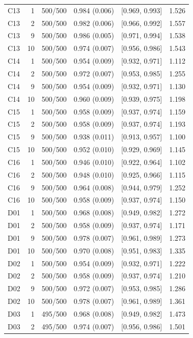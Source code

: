 \begin{longtable}[t]{lrllll}
C13 & 1 & 500/500 & 0.984 (0.006) & {}[0.969, 0.993] & 1.526\\
C13 & 2 & 500/500 & 0.982 (0.006) & {}[0.966, 0.992] & 1.557\\
C13 & 9 & 500/500 & 0.986 (0.005) & {}[0.971, 0.994] & 1.538\\
C13 & 10 & 500/500 & 0.974 (0.007) & {}[0.956, 0.986] & 1.543\\
C14 & 1 & 500/500 & 0.954 (0.009) & {}[0.932, 0.971] & 1.112\\
C14 & 2 & 500/500 & 0.972 (0.007) & {}[0.953, 0.985] & 1.255\\
C14 & 9 & 500/500 & 0.954 (0.009) & {}[0.932, 0.971] & 1.130\\
C14 & 10 & 500/500 & 0.960 (0.009) & {}[0.939, 0.975] & 1.198\\
C15 & 1 & 500/500 & 0.958 (0.009) & {}[0.937, 0.974] & 1.159\\
C15 & 2 & 500/500 & 0.958 (0.009) & {}[0.937, 0.974] & 1.193\\
C15 & 9 & 500/500 & 0.938 (0.011) & {}[0.913, 0.957] & 1.100\\
C15 & 10 & 500/500 & 0.952 (0.010) & {}[0.929, 0.969] & 1.145\\
C16 & 1 & 500/500 & 0.946 (0.010) & {}[0.922, 0.964] & 1.102\\
C16 & 2 & 500/500 & 0.948 (0.010) & {}[0.925, 0.966] & 1.115\\
C16 & 9 & 500/500 & 0.964 (0.008) & {}[0.944, 0.979] & 1.252\\
C16 & 10 & 500/500 & 0.958 (0.009) & {}[0.937, 0.974] & 1.150\\
D01 & 1 & 500/500 & 0.968 (0.008) & {}[0.949, 0.982] & 1.272\\
D01 & 2 & 500/500 & 0.958 (0.009) & {}[0.937, 0.974] & 1.171\\
D01 & 9 & 500/500 & 0.978 (0.007) & {}[0.961, 0.989] & 1.273\\
D01 & 10 & 500/500 & 0.970 (0.008) & {}[0.951, 0.983] & 1.335\\
D02 & 1 & 500/500 & 0.954 (0.009) & {}[0.932, 0.971] & 1.222\\
D02 & 2 & 500/500 & 0.958 (0.009) & {}[0.937, 0.974] & 1.210\\
D02 & 9 & 500/500 & 0.972 (0.007) & {}[0.953, 0.985] & 1.286\\
D02 & 10 & 500/500 & 0.978 (0.007) & {}[0.961, 0.989] & 1.361\\
D03 & 1 & 495/500 & 0.968 (0.008) & {}[0.949, 0.982] & 1.473\\
D03 & 2 & 495/500 & 0.974 (0.007) & {}[0.956, 0.986] & 1.501\\

\end{longtable}
